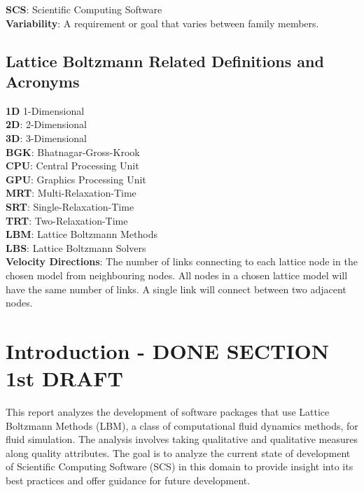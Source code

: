 \documentclass[12pt, notitlepage]{article}
\begin{document}
\begin{singlespace}
\noindent\textbf{SCS}: Scientific Computing Software\\

\noindent\textbf{Variability}: A requirement or goal that varies between family members.

\newpage
\subsection{Lattice Boltzmann Related Definitions and Acronyms}

\noindent\textbf{1D} 1-Dimensional\\

\noindent\textbf{2D}: 2-Dimensional\\

\noindent\textbf{3D}: 3-Dimensional\\

\noindent\textbf{BGK}: Bhatnagar-Gross-Krook\\

\noindent\textbf{CPU}: Central Processing Unit\\

\noindent\textbf{GPU}: Graphics Processing Unit\\

\noindent\textbf{MRT}: Multi-Relaxation-Time\\

\noindent\textbf{SRT}: Single-Relaxation-Time\\

\noindent\textbf{TRT}: Two-Relaxation-Time\\

\noindent\textbf{LBM}: Lattice Boltzmann Methods\\

\noindent\textbf{LBS}: Lattice Boltzmann Solvers\\

\noindent\textbf{Velocity Directions}: The number of links connecting to each lattice node in the chosen model from neighbouring nodes. All nodes in a chosen lattice model will have the same number of links. A single link will connect between two adjacent nodes.


\end{singlespace}
\newpage
\section{Introduction - DONE SECTION 1st DRAFT}

This report analyzes the development of software packages that use Lattice Boltzmann Methods (LBM), a class of computational fluid dynamics methods, for fluid simulation. The analysis involves taking qualitative and qualitative measures along quality attributes. The goal is to analyze the current state of development of Scientific Computing Software (SCS) in this domain to provide insight into its best practices and offer guidance for future development. 
\end{document}
